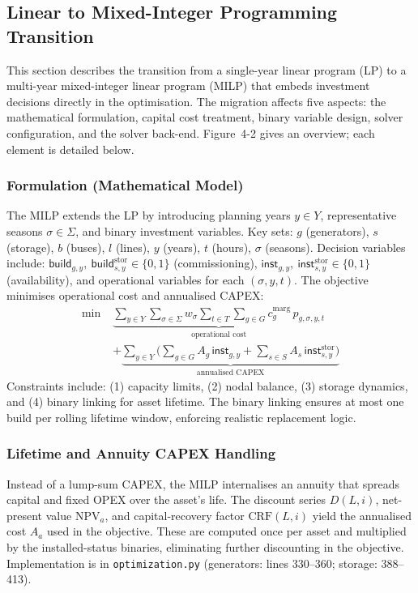 \subsection{Linear to Mixed-Integer Programming Transition}

This section describes the transition from a single-year linear program (LP) to a multi-year mixed-integer linear 
program (MILP) that embeds investment decisions directly in the optimisation. The migration affects five aspects: 
the mathematical formulation, capital cost treatment, binary variable design, solver configuration, and the solver 
back-end. Figure~4-2 gives an overview; each element is detailed below.

\subsubsection{Formulation (Mathematical Model)}

The MILP extends the LP by introducing planning years $y \in Y$, representative seasons $\sigma \in \Sigma$, and 
binary investment variables. Key sets: $g$ (generators), $s$ (storage), $b$ (buses), $l$ (lines), $y$ (years), 
$t$ (hours), $\sigma$ (seasons).
Decision variables include: $\textsf{build}_{g,y},\ \textsf{build}^{\text{stor}}_{s,y} \in \{0,1\}$ 
(commissioning), $\textsf{inst}_{g,y},\ \textsf{inst}^{\text{stor}}_{s,y} \in \{0,1\}$ (availability), and operational 
variables for each $(\sigma, y, t)$. The objective minimises operational cost and annualised CAPEX:
\begin{align*}
\min\; & \underbrace{\sum_{y\in Y}\sum_{\sigma\in\Sigma}w_\sigma \sum_{t\in T}\sum_{g\in G} c^{\text{marg}}_g\,
p_{g,\sigma,y,t}}_{\text{operational cost}} \\
&+ \underbrace{\sum_{y\in Y}\Bigg( \sum_{g\in G}A_g\,\textsf{inst}_{g,y}+ 
\sum_{s\in S}A_s\,\textsf{inst}^{\text{stor}}_{s,y}\Bigg)}_{\text{annualised CAPEX}}
\end{align*}
Constraints include: (1) capacity limits, (2) nodal balance, (3) storage dynamics, and (4) binary linking for asset 
lifetime. The binary linking ensures at most one build per rolling lifetime window, enforcing realistic replacement 
logic.

\subsubsection{Lifetime and Annuity CAPEX Handling}

Instead of a lump-sum CAPEX, the MILP internalises an annuity that spreads capital and fixed OPEX over the asset's life. The discount series $D(L,i)$, net-present value $\text{NPV}_a$, and capital-recovery factor $\text{CRF}(L,i)$ yield the annualised cost $A_a$ used in the objective. These are computed once per asset and multiplied by the installed-status binaries, eliminating further discounting in the objective. Implementation is in \texttt{optimization.py} (generators: lines 330--360; storage: 388--413).

